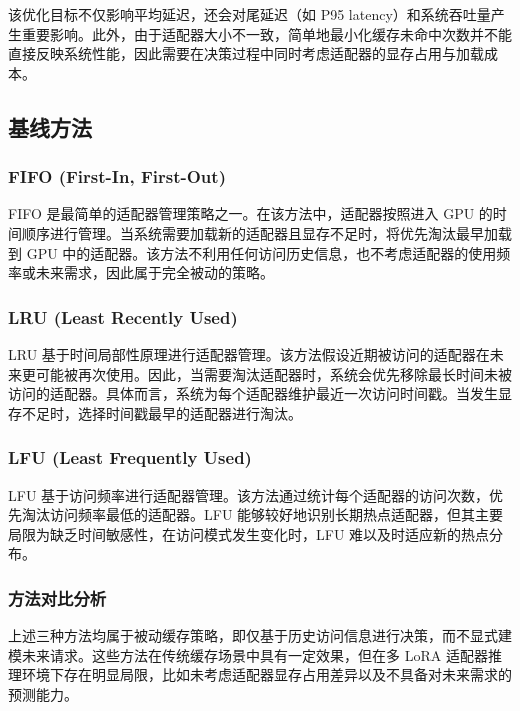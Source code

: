 该优化目标不仅影响平均延迟，还会对尾延迟（如 P95 latency）和系统吞吐量产生重要影响。此外，由于适配器大小不一致，简单地最小化缓存未命中次数并不能直接反映系统性能，因此需要在决策过程中同时考虑适配器的显存占用与加载成本。

\subsection{基线方法}
\subsubsection{FIFO (First-In, First-Out)}
FIFO 是最简单的适配器管理策略之一。在该方法中，适配器按照进入 GPU 的时间顺序进行管理。当系统需要加载新的适配器且显存不足时，将优先淘汰最早加载到 GPU 中的适配器。该方法不利用任何访问历史信息，也不考虑适配器的使用频率或未来需求，因此属于完全被动的策略。

\subsubsection{LRU (Least Recently Used)}
LRU 基于时间局部性原理进行适配器管理。该方法假设近期被访问的适配器在未来更可能被再次使用。因此，当需要淘汰适配器时，系统会优先移除最长时间未被访问的适配器。具体而言，系统为每个适配器维护最近一次访问时间戳。当发生显存不足时，选择时间戳最早的适配器进行淘汰。

\subsubsection{LFU (Least Frequently Used)}
LFU 基于访问频率进行适配器管理。该方法通过统计每个适配器的访问次数，优先淘汰访问频率最低的适配器。LFU 能够较好地识别长期热点适配器，但其主要局限为缺乏时间敏感性，在访问模式发生变化时，LFU 难以及时适应新的热点分布。

\subsubsection{方法对比分析}
上述三种方法均属于被动缓存策略，即仅基于历史访问信息进行决策，而不显式建模未来请求。这些方法在传统缓存场景中具有一定效果，但在多 LoRA 适配器推理环境下存在明显局限，比如未考虑适配器显存占用差异以及不具备对未来需求的预测能力。
